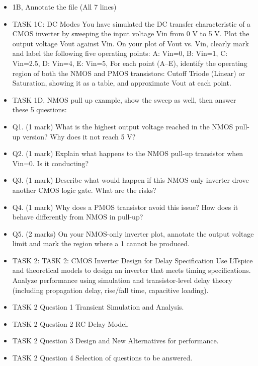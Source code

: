 \documentclass[a4paper,12pt]{article}
\begin{document}
\begin{itemize}
    \item 1B, Annotate the file (All 7 lines)
    \item TASK 1C: DC Modes You have simulated the DC transfer characteristic of a CMOS inverter by sweeping the input voltage Vin from 0 V to 5 V. Plot the 
    output voltage Vout against Vin. On your plot of Vout vs. Vin, clearly mark and label the following five operating points:
    A: Vin=0, B: Vin=1, C: Vin=2.5, D: Vin=4, E: Vin=5, For each point (A–E), identify the operating region of both the NMOS and PMOS transistors: Cutoff
    Triode (Linear) or Saturation, showing it as a table, and approximate Vout at each point.
    \item TASK 1D, NMOS pull up example, show the sweep as well, then answer these 5 questions:
    \item Q1. (1 mark) What is the highest output voltage reached in the NMOS pull-up version? Why does it not reach 5 V?
    \item Q2. (1 mark) Explain what happens to the NMOS pull-up transistor when Vin=0. Is it conducting?
    \item Q3. (1 mark) Describe what would happen if this NMOS-only inverter drove another CMOS logic gate. What are the risks?
    \item Q4. (1 mark) Why does a PMOS transistor avoid this issue? How does it behave differently from NMOS in pull-up?
    \item Q5. (2 marks) On your NMOS-only inverter plot, annotate the output voltage limit and mark the region where a 1 cannot be produced.
    \item TASK 2: TASK 2: CMOS Inverter Design for Delay Specification
    Use LTspice and theoretical models to design an inverter that meets timing specifications. Analyze
    performance using simulation and transistor-level delay theory (including propagation delay, rise/fall
    time, capacitive loading).
    \item TASK 2 Question 1 Transient Simulation and Analysis.
    \item TASK 2 Question 2 RC Delay Model.
    \item TASK 2 Question 3 Design and New Alternatives for performance.
    \item TASK 2 Question 4 Selection of questions to be answered.
\end{itemize}
\end{document}

